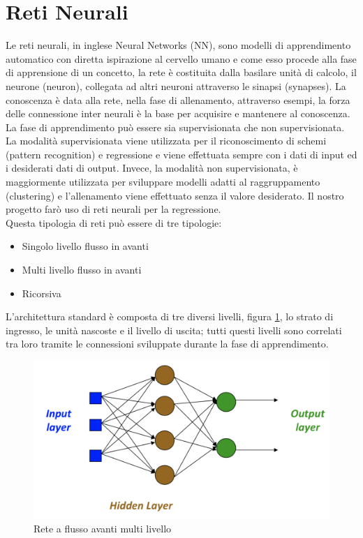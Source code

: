 \documentclass[%
    corpo=12pt,
    twoside,
    oldstyle,
    autoretitolo,
    greek,
    evenboxes,
]{toptesi}
\begin{document}
\section{Reti Neurali}
Le reti neurali, in inglese Neural Networks (NN), sono modelli di apprendimento automatico con diretta ispirazione al cervello umano e come esso procede alla fase di apprensione di un concetto, la rete è costituita dalla basilare unità di calcolo, il neurone (neuron), collegata ad altri neuroni attraverso le sinapsi (synapses). La conoscenza è data alla rete, nella fase di allenamento, attraverso esempi, la forza delle connessione inter neurali è la base per acquisire e mantenere al conoscenza.\\
La fase di apprendimento può essere sia supervisionata che non supervisionata. La modalità supervisionata viene utilizzata per il riconoscimento di schemi (pattern recognition) e regressione e viene effettuata sempre con i dati di input ed i desiderati dati di output. Invece, la modalità non supervisionata, è maggiormente utilizzata per sviluppare modelli adatti al raggruppamento (clustering) e l'allenamento viene effettuato senza il valore desiderato. Il nostro progetto farò uso di reti neurali per la regressione.\\
Questa tipologia di reti può essere di tre tipologie:
\begin{itemize}
  \item Singolo livello flusso in avanti
  \item Multi livello flusso in avanti
  \item Ricorsiva
\end{itemize}
L'architettura standard è composta di tre diversi livelli, figura \ref{fig:mlff}, lo strato di ingresso, le unità nascoste e il livello di uscita; tutti questi livelli sono correlati tra loro tramite le connessioni sviluppate durante la fase di apprendimento.
\begin{figure}[!ht]
  \includegraphics[width=\linewidth]{figure/feed_foward.png}
  \caption{Rete a flusso avanti multi livello}
  \label{fig:mlff}
\end{figure}
\end{document}
